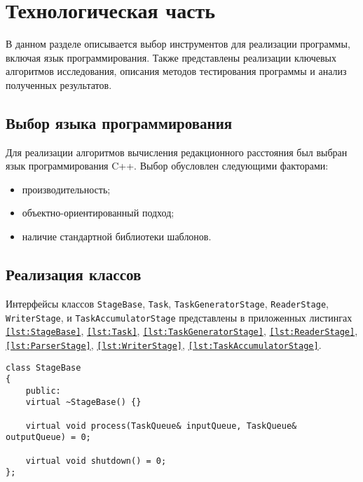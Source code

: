 \chapter{Технологическая часть}
В данном разделе описывается выбор инструментов для реализации программы, включая язык программирования. Также представлены реализации ключевых алгоритмов исследования, описания методов тестирования программы и анализ полученных результатов.

\section{Выбор языка программирования}

Для реализации алгоритмов вычисления редакционного расстояния был выбран язык программирования C++. Выбор обусловлен следующими факторами:

\begin{itemize}[label=---]
	\item {производительность};
	\item {объектно-ориентированный подход};
	\item {наличие стандартной библиотеки шаблонов}.
\end{itemize}

\section{Реализация классов}
Интерфейсы классов \texttt{StageBase}, \texttt{Task}, \texttt{TaskGeneratorStage}, \texttt{ReaderStage}, \texttt{WriterStage}, и \texttt{TaskAccumulatorStage} представлены в приложенных листингах \texttt{\ref{lst:StageBase}}, \texttt{\ref{lst:Task}},  \texttt{\ref{lst:TaskGeneratorStage}}, \texttt{\ref{lst:ReaderStage}},  \texttt{\ref{lst:ParserStage}}, \texttt{\ref{lst:WriterStage}},  \texttt{\ref{lst:TaskAccumulatorStage}}.

\begin{center}
	\captionsetup{justification=raggedright,singlelinecheck=off}
	\begin{lstlisting}[caption={Интерфейс класса StageBase}, label={lst:StageBase}]
class StageBase
{
	public:
	virtual ~StageBase() {}
	
	virtual void process(TaskQueue& inputQueue, TaskQueue& outputQueue) = 0;
	
	virtual void shutdown() = 0;
};
	\end{lstlisting}
\end{center}

